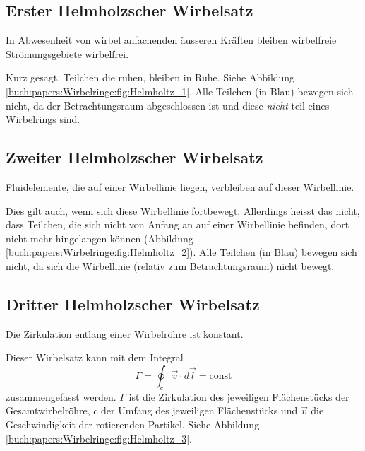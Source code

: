 \subsection{Erster Helmholzscher Wirbelsatz}

\begin{satz}
    In Abwesenheit von wirbel anfachenden äusseren Kräften bleiben wirbelfreie Strömungsgebiete wirbelfrei.
\end{satz}

Kurz gesagt, Teilchen die ruhen, bleiben in Ruhe. 
Siehe Abbildung \ref{buch:papers:Wirbelringe:fig:Helmholtz_1}. 
Alle Teilchen (in Blau) bewegen sich nicht, da der Betrachtungsraum abgeschlossen ist und diese {\em nicht} teil eines Wirbelrings sind.

\subsection{Zweiter Helmholzscher Wirbelsatz}

\begin{satz}
    Fluidelemente, die auf einer Wirbellinie liegen, verbleiben auf dieser Wirbellinie.
\end{satz}

Dies gilt auch, wenn sich diese Wirbellinie fortbewegt. 
Allerdings heisst das nicht, dass Teilchen, die sich nicht von Anfang an auf einer Wirbellinie befinden, dort nicht mehr hingelangen können (Abbildung \ref{buch:papers:Wirbelringe:fig:Helmholtz_2}). 
Alle Teilchen (in Blau) bewegen sich nicht, da sich die Wirbellinie (relativ zum Betrachtungsraum) nicht bewegt.

\subsection{Dritter Helmholzscher Wirbelsatz}

\begin{satz}
    Die Zirkulation entlang einer Wirbelröhre ist konstant. 
\end{satz}

Dieser Wirbelsatz kann mit dem Integral 
\[
\Gamma
= 
\oint_{c} \vec{v} \cdot d \vec{l}
=
\text{const}
\]
zusammengefasst werden. 
\(\Gamma\) ist die Zirkulation des jeweiligen Flächenstücks der Gesamtwirbelröhre, \(c\) der Umfang des jeweiligen Flächenstücks und \(\vec{v}\) die Geschwindigkeit der rotierenden Partikel. 
Siehe Abbildung \ref{buch:papers:Wirbelringe:fig:Helmholtz_3}. 


